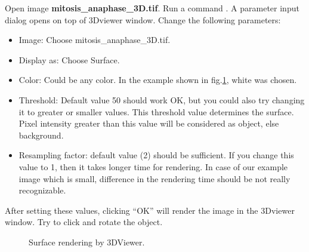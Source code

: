 \begin{indentexercise}{4}
Open image \textbf{mitosis\_anaphase\_3D.tif}.
Run a command . A parameter input dialog opens on top of 3Dviewer window. Change the following parameters:
\begin{itemize}
\item Image: Choose mitosis\_anaphase\_3D.tif.
\item Display as: Choose Surface.
\item Color: Could be any color. In the example shown in fig.\ref{fig:3DviewerSurface}, white was chosen. 
\item Threshold: Default value 50 should work OK, but you could also try changing it to greater or smaller values. This threshold value determines the surface. Pixel intensity greater than this value will be considered as object, else background. 
\item Resampling factor: default value (2) should be sufficient. If you change this value to 1, then it takes longer time for rendering. In case of our example image which is small, difference in the rendering time should be not really recognizable. 
\end{itemize}

After setting these values, clicking ``OK'' will render the image in the 3Dviewer window. Try to click and rotate the object. 

\begin{figure}[h!]
 \centering
 \quad
 \caption{Surface rendering by 3DViewer.}
 \label{fig:3DviewerSurface}
\end{figure}
\end{indentexercise}

